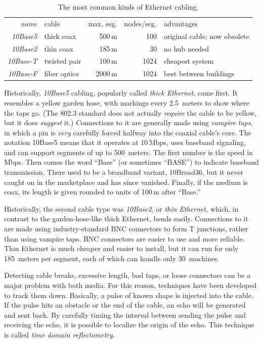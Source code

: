 \begin{table}
   \centering
   \begin{tabular}{rlrrl}
   \textit{name}     & cable         & max. seg. & nodes/seg. & advantages                   \\[.75ex]
   \textit{10Base5}  & thick coax    &    500\,m &        100 & original cable; now obsolete \\
   \textit{10Base2}  & thin coax     &    185\,m &         30 & no hub needed                \\
   \textit{10Base-T} & twisted pair  &    100\,m &       1024 & cheapest system              \\
   \textit{10Base-F} & fiber optics  &   2000\,m &       1024 & best between buildings       \\
   \end{tabular}
   \caption{The most common kinds of Ethernet cabling.}
   \label{fig:common-ethernet-cabling}
\end{table}


Historically, \emph{10Base5} cabling, popularly called \emph{thick Ethernet}, came first.
It resembles a yellow garden hose, with markings every 2.5~meters to show where the taps go.
(The 802.3 standard does not actually \emph{require} the cable to be yellow, but it does \emph{suggest} it.)
Connections to it are generally made using \emph{vampire taps}, in which a pin is \emph{very} carefully forced halfway into the coaxial cable's core.
The notation 10Base5 means that it operates at 10\,Mbps, uses baseband signaling, and can support segments of up to 500~meters.
The first number is the speed
in Mbps. Then comes the word ``Base'' (or sometimes ``BASE'') to
indicate baseband transmission. There used to be a broadband variant,
10Broad36, but it never caught on in the marketplace and has since
vanished. Finally, if the medium is coax, its length is given rounded to
units of 100\,m after ``Base.''

Historically, the second cable type was \emph{10Base2}, or \emph{thin Ethernet,}
which, in contrast to the garden-hose-like thick Ethernet, bends easily.
Connections to it are made using industry-standard BNC connectors to
form T junctions, rather than using vampire taps. BNC connectors are
easier to use and more reliable. Thin Ethernet is much cheaper and
easier to install, but it can run for only 185~meters per segment, each of which can handle only 30~machines.

Detecting cable breaks, excessive length, bad taps, or loose connectors
can be a major problem with both media. For this reason, techniques have
been developed to track them down. Basically, a pulse of known shape is
injected into the cable. If the pulse hits an obstacle or the end of the
cable, an echo will be generated and sent back. By carefully timing the
interval between sending the pulse and receiving the echo, it is
possible to localize the origin of the echo. This technique is called
\emph{time domain reflectometry}.

